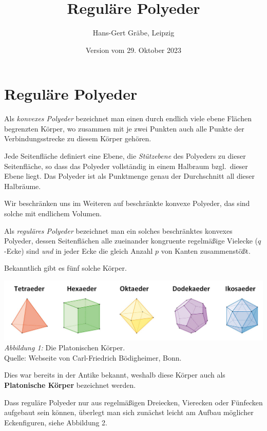 \documentclass[11pt]{article}
\author{Hans-Gert Gräbe, Leipzig}
\title{Reguläre Polyeder\kosemnetlicensemark}
\date{Version vom 29. Oktober 2023}
\begin{document}
\maketitle

\section*{Reguläre Polyeder}

Als \emph{konvexes Polyeder} bezeichnet man einen durch endlich viele ebene
Flä\-chen begrenzten Körper, wo zusammen mit je zwei Punkten auch alle Punkte
der Verbindungsstrecke zu diesem Körper gehören.

Jede Seitenfläche definiert eine Ebene, die \emph{Stützebene} des Polyeders zu
dieser Seitenfläche, so dass das Polyeder vollständig in einem Halbraum
bzgl.\ dieser Ebene liegt. Das Polyeder ist als Punktmenge genau der
Durchschnitt all dieser Halbräume. 

Wir beschränken uns im Weiteren auf beschränkte konvexe Polyeder, das sind
solche mit endlichem Volumen. 

Als \emph{reguläres Polyeder} bezeichnet man ein solches beschränktes konvexes
Polyeder, dessen Seitenflächen alle zueinander kongruente regelmäßige Vielecke
($q$-Ecke) sind \emph{und} in jeder Ecke die gleich Anzahl $p$ von Kanten
zusammenstößt.

Bekanntlich gibt es fünf solche Körper.
\begin{center}
  \includegraphics[width=.8\textwidth]{graebe-05-1/PlatonischeKoerper.jpg}\\
  \emph{Abbildung 1:} Die Platonischen Körper.\\ Quelle: Webseite von
  Carl-Friedrich Bödigheimer, Bonn. 
\end{center}
Dies war bereits in der Antike bekannt, weshalb diese Körper auch als
\textbf{Platonische Körper} bezeichnet werden.  

Dass reguläre Polyeder nur aus regelmäßigen Dreiecken, Vierecken oder
Fünfecken aufgebaut sein können, überlegt man sich zunächst leicht am Aufbau
möglicher Eckenfiguren, siehe Abbildung 2.
\end{document}
